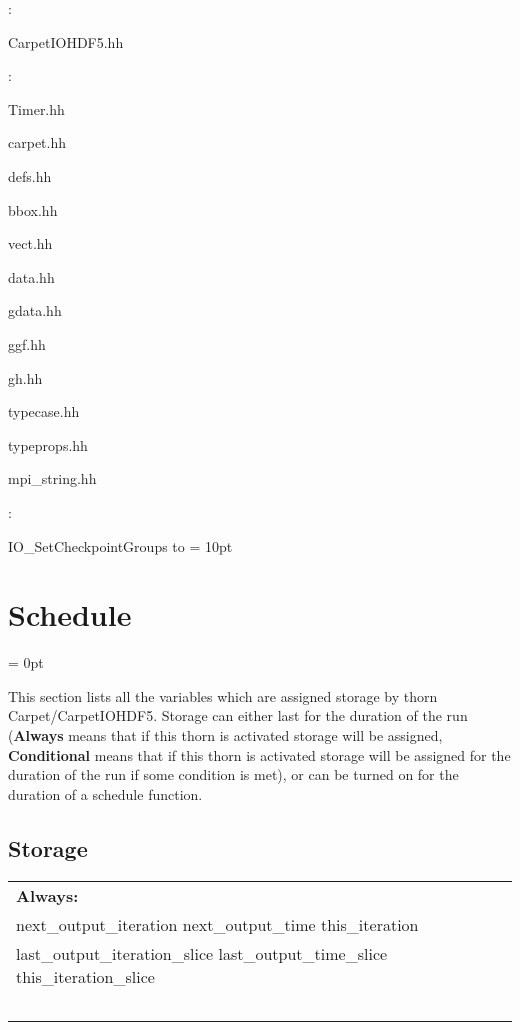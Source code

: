 \documentclass{article}
\begin{document}
\vspace{5mm}

: 



CarpetIOHDF5.hh
\vspace{2mm}

: 

Timer.hh

carpet.hh

defs.hh

bbox.hh

vect.hh

data.hh

gdata.hh

ggf.hh

gh.hh

typecase.hh

typeprops.hh

mpi\_string.hh
\vspace{2mm}

: 



IO\_SetCheckpointGroups to 
\vspace{2mm}\parskip = 10pt 

\section{Schedule} 


\parskip = 0pt


\noindent This section lists all the variables which are assigned storage by thorn Carpet/CarpetIOHDF5.  Storage can either last for the duration of the run ({\bf Always} means that if this thorn is activated storage will be assigned, {\bf Conditional} means that if this thorn is activated storage will be assigned for the duration of the run if some condition is met), or can be turned on for the duration of a schedule function.


\subsection*{Storage}

\hspace{5mm}

 \begin{tabular*}{160mm}{ll} 

{\bf Always:}&  ~ \\ 
 next\_output\_iteration next\_output\_time this\_iteration & ~\\ 
 last\_output\_iteration\_slice last\_output\_time\_slice this\_iteration\_slice & ~\\ 
~ & ~\\ 
\end{tabular*} 
\end{document}
